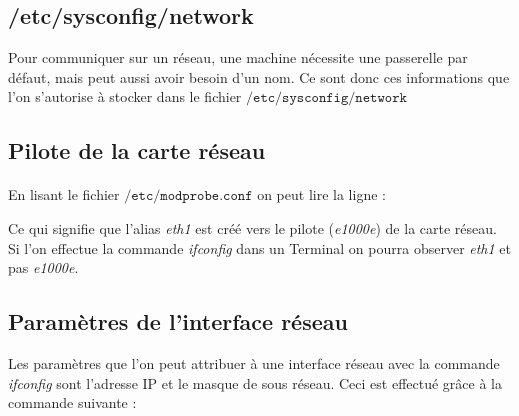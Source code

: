 \documentclass[12pt,a4paper,notitlepage]{article}
\begin{document}
\subsection{/etc/sysconfig/network}
Pour communiquer sur un réseau, une machine nécessite une passerelle par défaut, mais peut aussi avoir besoin d'un nom. Ce sont donc ces informations que l'on s'autorise à stocker dans le fichier $\mathtt{/etc/sysconfig/network}$

\begin{center}
 \end{center}

\subsection{Pilote de la carte réseau}
\paragraph{}En lisant le fichier $\mathtt{/etc/modprobe.conf}$ on peut lire la ligne :

\begin{center}
 \end{center}

Ce qui signifie que l'alias \textit{eth1} est créé vers le pilote (\textit{e1000e}) de la carte réseau. Si l'on effectue la commande \textit{ifconfig} dans un Terminal on pourra observer \textit{eth1} et pas \textit{e1000e}.

\subsection{Paramètres de l'interface réseau}

Les paramètres que l'on peut attribuer à une interface réseau avec la commande \textit{ifconfig} sont l'adresse IP et le masque de sous réseau. Ceci est effectué grâce à la commande suivante :\\
\end{document}

